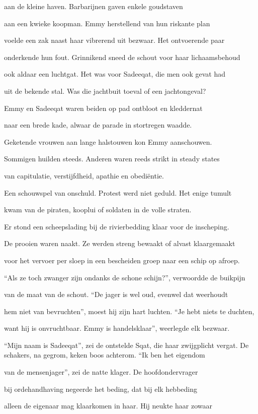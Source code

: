 aan de kleine haven.
Barbarijnen gaven
enkele goudstaven

aan een kwieke koopman.
Emmy herstellend van
hun riskante plan

voelde een zak naast haar
vibrerend uit bezwaar.
Het ontvoerende paar

onderkende hun fout.
Grinnikend sneed de schout
voor haar lichaamsbehoud

ook aldaar een luchtgat.
Het was voor Sadeeqat,
die men ook gevat had

uit de bekende stal.
Was die jachtbuit toeval
of een jachtongeval?

Emmy en Sadeeqat
waren beiden op pad
ontbloot en kleddernat

naar een brede kade,
alwaar de parade
in stortregen waadde.

Geketende vrouwen
aan lange halstouwen
kon Emmy aanschouwen.

Sommigen huilden steeds.
Anderen waren reeds
strikt in steady states

van capitulatie,
verstijfdheid, apathie
en obediëntie.

Een schouwspel van onschuld.
Protest werd niet geduld.
Het enige tumult

kwam van de piraten,
kooplui of soldaten
in de volle straten.

Er stond een scheepslading
bij de rivierbedding
klaar voor de inscheping.

De prooien waren naakt.
Ze werden streng bewaakt
of alvast klaargemaakt

voor het vervoer per sloep
in een bescheiden groep
naar een schip op afroep.

“Als ze toch zwanger zijn
ondanks de schone schijn?”,
verwoordde de buikpijn

van de maat van de schout.
“De jager is wel oud,
evenwel dat weerhoudt

hem niet van bevruchten”,
moest hij zijn hart luchten.
“Je hebt niets te duchten,

want hij is onvruchtbaar.
Emmy is handelsklaar”,
weerlegde elk bezwaar.

“Mijn naam is Sadeeqat”,
zei de ontstelde Sqat,
die haar zwijgplicht vergat.
De schakers, na gegrom,
keken boos achterom.
“Ik ben het eigendom

van de mensenjager”,
zei de natte klager.
De hoofdondervrager

bij ordehandhaving
negeerde het beding,
dat bij elk hebbeding

alleen de eigenaar
mag klaarkomen in haar.
Hij neukte haar zowaar

